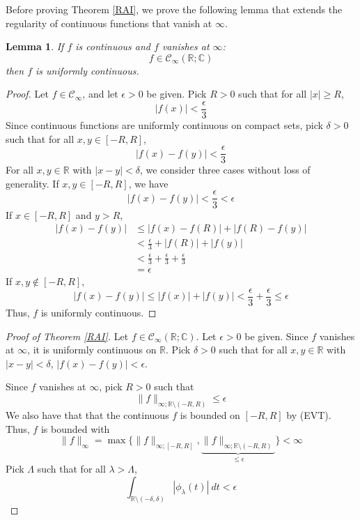\documentclass[12pt, reqno]{amsart}
\newtheorem{lemma}[theorem]{Lemma}
\theoremstyle{definition}
\theoremstyle{remark}
\begin{document}
\begin{itemize}
\begin{itemize}
\vspace*{20 pt}

Before proving Theorem \ref{RAI}, we prove the following lemma that extends the regularity of continuous functions that vanish at $\infty$.

\begin{lemma} \label{vanish}
    If $f$ is continuous and $f$ vanishes at $\infty$: 
    \[
        f\in\mathcal{C}_{\infty}(\mathbb{R;C})
    \]
    then $f$ is uniformly continuous.
\end{lemma}

\begin{proof}

Let $f\in\mathcal{C}_{\infty}$, and let $\epsilon>0$ be given. Pick $R>0$ such that for all $|x|\ge R$, $$|f(x)|< \frac{\epsilon}{3}$$
Since continuous functions are uniformly continuous on compact sets, pick $\delta>0$ such that for all $x,y\in[-R,R]$, $$|f(x)-f(y)|< \frac{\epsilon}{3}$$
For all $x,y\in \mathbb{R}$ with $|x-y|<\delta$, we consider three cases without loss of generality. If $x,y\in[-R,R]$, we have $$|f(x)-f(y)|< \frac{\epsilon}{3}<\epsilon$$
If $x\in[-R,R]$ and $y>R$, 
\begin{align*}
    |f(x)-f(y)|&\le |f(x)-f(R)|+|f(R)-f(y)|\\
    &< \frac{\epsilon}{3}+|f(R)|+|f(y)|\\
    &< \frac{\epsilon}{3}+ \frac{\epsilon}{3}+ \frac{\epsilon}{3}\\
    &=\epsilon
\end{align*}
If $x,y\notin[-R,R]$, $$|f(x)-f(y)|\le |f(x)|+|f(y)|< \frac{\epsilon}{3}+ \frac{\epsilon}{3}\le\epsilon$$
Thus, $f$ is uniformly continuous.
\end{proof}

\begin{proof}[Proof of Theorem \ref{RAI}]
  
    Let $f\in \mathcal{C}_{\infty}(\mathbb{R};\mathbb{C})$. Let $\epsilon>0$ be given. Since $f$ vanishes at $\infty$, it is uniformly continuous on $\mathbb{R}$. Pick $\delta>0$ such that for all $x,y\in \mathbb{R}$ with $|x-y|<\delta$, $|f(x)-f(y)|<\epsilon$.

    \vspace*{10 pt}

Since $f$ vanishes at $\infty$, pick $R>0$ such that $$\|f\|_{\infty;\mathbb{R}\setminus(-R,R)}\le \epsilon$$
We also have that that the continuous $f$ is bounded on $[-R,R]$ by (EVT). Thus, $f$ is bounded with $$\|f\|_{\infty}=\max\{\|f\|_{\infty;[-R,R]} ,\underbrace{\|f\|_{\infty;\mathbb{R}\setminus(-R,R)}}_{\le \epsilon}\}<\infty$$
Pick $\Lambda$ such that for all $\lambda>\Lambda$, $$\int_{\mathbb{R}\setminus(-\delta,\delta)}|\phi_{\lambda}(t)|\ dt<\epsilon$$


\end{proof}
\end{itemize}
\end{itemize}
\end{document}
